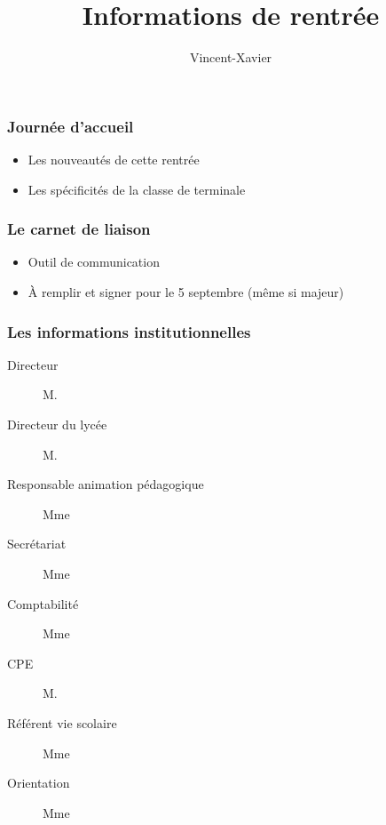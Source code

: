 \documentclass[frenchb]{beamer}
\title{Informations de rentrée}
\author{Vincent-Xavier \bsc{Jumel}}
\institute{LaSalle Saint-Denis}
\begin{document}
\begin{frame}
  \maketitle
\end{frame}

\begin{frame}
  \frametitle{Journée d'accueil}
    \begin{itemize}
      \item Les nouveautés de cette rentrée
      \item Les spécificités de la classe de terminale
    \end{itemize}
\end{frame}

\begin{frame}
  \frametitle{Le carnet de liaison}
  \begin{itemize}
    \item Outil de communication
    \item À remplir et signer pour le 5 septembre (même si majeur)
  \end{itemize}
\end{frame}

\begin{frame}
  \frametitle{Les informations institutionnelles}
  \begin{description}
    \item[Directeur] M. 
    \item[Directeur du lycée] M. 
    \item[Responsable animation pédagogique] Mme 
    \item[Secrétariat] Mme 
    \item[Comptabilité] Mme 
    \item[CPE] M. 
    \item[Référent vie scolaire] Mme 
    \item[Orientation] Mme 
  \end{description}
\end{frame}
\end{document}
